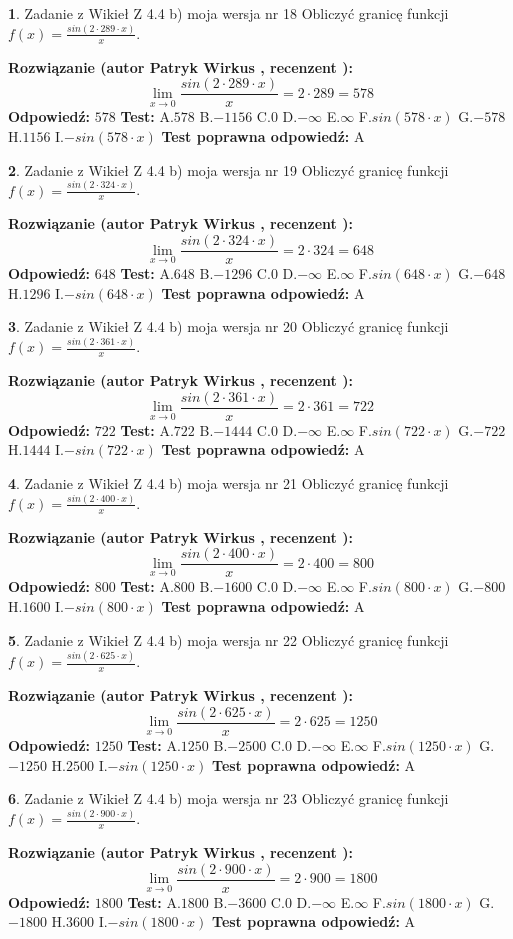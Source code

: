 \documentclass[12pt, a4paper]{article}
\theoremstyle{definition} %
\newtheorem{zad}{}
\newcommand{\zadStart}[1]{\begin{zad}#1\newline}
\newcommand{\zadStop}{\end{zad}}
\newcommand{\rozwStart}[2]{\noindent \textbf{Rozwiązanie (autor #1 , recenzent #2): }\newline}
\newcommand{\rozwStop}{\newline}
\newcommand{\odpStart}{\noindent \textbf{Odpowiedź:}\newline}
\newcommand{\odpStop}{\newline}
\newcommand{\testStart}{\noindent \textbf{Test:}\newline}
\newcommand{\testStop}{\newline}
\newcommand{\kluczStart}{\noindent \textbf{Test poprawna odpowiedź:}\newline}
\newcommand{\kluczStop}{\newline}
\begin{document}
\zadStart{Zadanie z Wikieł Z 4.4 b) moja wersja nr 18}
Obliczyć granicę funkcji $f(x)=\frac{sin(2 \cdot289\cdot x)}{x}$.
\zadStop
\rozwStart{Patryk Wirkus}{}
$$\lim\limits_{x\to 0}\frac{sin(2 \cdot 289\cdot x)}{x}=
2 \cdot 289 = 578$$
\rozwStop
\odpStart
$578$
\odpStop
\testStart
A.$578$
B.$-1156$
C.$0$
D.$-\infty$
E.$\infty$
F.$sin(578\cdot x)$
G.$-578$
H.$1156$
I.$-sin(578\cdot x)$
\testStop
\kluczStart
A
\kluczStop



\zadStart{Zadanie z Wikieł Z 4.4 b) moja wersja nr 19}
Obliczyć granicę funkcji $f(x)=\frac{sin(2 \cdot324\cdot x)}{x}$.
\zadStop
\rozwStart{Patryk Wirkus}{}
$$\lim\limits_{x\to 0}\frac{sin(2 \cdot 324\cdot x)}{x}=
2 \cdot 324 = 648$$
\rozwStop
\odpStart
$648$
\odpStop
\testStart
A.$648$
B.$-1296$
C.$0$
D.$-\infty$
E.$\infty$
F.$sin(648\cdot x)$
G.$-648$
H.$1296$
I.$-sin(648\cdot x)$
\testStop
\kluczStart
A
\kluczStop



\zadStart{Zadanie z Wikieł Z 4.4 b) moja wersja nr 20}
Obliczyć granicę funkcji $f(x)=\frac{sin(2 \cdot361\cdot x)}{x}$.
\zadStop
\rozwStart{Patryk Wirkus}{}
$$\lim\limits_{x\to 0}\frac{sin(2 \cdot 361\cdot x)}{x}=
2 \cdot 361 = 722$$
\rozwStop
\odpStart
$722$
\odpStop
\testStart
A.$722$
B.$-1444$
C.$0$
D.$-\infty$
E.$\infty$
F.$sin(722\cdot x)$
G.$-722$
H.$1444$
I.$-sin(722\cdot x)$
\testStop
\kluczStart
A
\kluczStop



\zadStart{Zadanie z Wikieł Z 4.4 b) moja wersja nr 21}
Obliczyć granicę funkcji $f(x)=\frac{sin(2 \cdot400\cdot x)}{x}$.
\zadStop
\rozwStart{Patryk Wirkus}{}
$$\lim\limits_{x\to 0}\frac{sin(2 \cdot 400\cdot x)}{x}=
2 \cdot 400 = 800$$
\rozwStop
\odpStart
$800$
\odpStop
\testStart
A.$800$
B.$-1600$
C.$0$
D.$-\infty$
E.$\infty$
F.$sin(800\cdot x)$
G.$-800$
H.$1600$
I.$-sin(800\cdot x)$
\testStop
\kluczStart
A
\kluczStop



\zadStart{Zadanie z Wikieł Z 4.4 b) moja wersja nr 22}
Obliczyć granicę funkcji $f(x)=\frac{sin(2 \cdot625\cdot x)}{x}$.
\zadStop
\rozwStart{Patryk Wirkus}{}
$$\lim\limits_{x\to 0}\frac{sin(2 \cdot 625\cdot x)}{x}=
2 \cdot 625 = 1250$$
\rozwStop
\odpStart
$1250$
\odpStop
\testStart
A.$1250$
B.$-2500$
C.$0$
D.$-\infty$
E.$\infty$
F.$sin(1250\cdot x)$
G.$-1250$
H.$2500$
I.$-sin(1250\cdot x)$
\testStop
\kluczStart
A
\kluczStop



\zadStart{Zadanie z Wikieł Z 4.4 b) moja wersja nr 23}
Obliczyć granicę funkcji $f(x)=\frac{sin(2 \cdot900\cdot x)}{x}$.
\zadStop
\rozwStart{Patryk Wirkus}{}
$$\lim\limits_{x\to 0}\frac{sin(2 \cdot 900\cdot x)}{x}=
2 \cdot 900 = 1800$$
\rozwStop
\odpStart
$1800$
\odpStop
\testStart
A.$1800$
B.$-3600$
C.$0$
D.$-\infty$
E.$\infty$
F.$sin(1800\cdot x)$
G.$-1800$
H.$3600$
I.$-sin(1800\cdot x)$
\testStop
\kluczStart
A
\kluczStop
\end{document}

